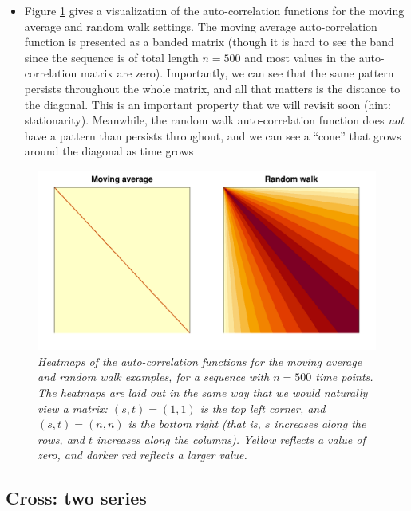 \documentclass{article}
\begin{document}
\begin{itemize}
\item Figure \ref{fig:autocor} gives a visualization of the auto-correlation
  functions for the moving average and random walk settings. The moving average
  auto-correlation function is presented as a banded matrix (though it is hard
  to see the band since the sequence is of total length $n=500$ and most values
  in the auto-correlation matrix are zero). Importantly, we can see that the
  same pattern persists throughout the whole matrix, and all that matters is the 
  distance to the diagonal. This is an important property that we will revisit
  soon (hint: stationarity). Meanwhile, the random walk auto-correlation
  function does \emph{not} have a pattern than persists throughout, and we can
  see a ``cone'' that grows around the diagonal as time grows
\end{itemize}

\begin{figure}[htb]
\centering
\includegraphics[width=\textwidth]{fig/autocor-1.pdf}
\caption{\it Heatmaps of the auto-correlation functions for the moving average 
  and random walk examples, for a sequence with $n=500$ time points. The  
  heatmaps are laid out in the same way that we would naturally view a matrix:
  $(s,t) = (1,1)$ is the top left corner, and $(s,t) = (n,n)$ is the bottom
  right (that is, $s$ increases along the rows, and $t$ increases along the
  columns). Yellow reflects a value of zero, and darker red reflects a larger
  value.} 
\label{fig:autocor}
\end{figure}

\subsection{Cross: two series}
\end{document}
